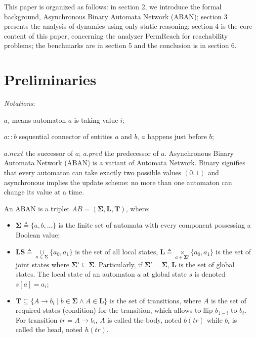 \documentclass[runningheads]{llncs}
\begin{document}
This paper is organized as follows: in section 2, we introduce the formal background, Asynchronous Binary Automata Network (ABAN); section 3 presents the analysis of dynamics using only static reasoning; 
section 4 is the core content of this paper, concerning the analyzer PermReach for reachability problems; 
the benchmarks are in section 5 and the conclusion is in section 6.
\section{Preliminaries}\label{sect:2}
\textit{Notations}:

$a_i$ means automaton $a$ is taking value $i$;

$a::b$ sequential connector of entities $a$ and $b$, $a$ happens just before $b$;

$a.next$ the successor of $a$; $a.pred$ the predecessor of $a$.
\bigbreak
Asynchronous Binary Automata Network (ABAN) is a variant of Automata Network.
Binary signifies that every automaton can take exactly two possible values $(0,1)$ and asynchronous implies the update scheme: no more than one automaton can change its value at a time. 

\begin{definition}[ABAN]
An ABAN is a triplet $AB = (\mathbf{\Sigma},\mathbf{L},\mathbf{T})$, where:
\begin{itemize}
\item $\mathbf{\Sigma}\triangleq\{a,b,\ldots\}$ is the finite set of automata with every component possessing a Boolean value;
\item %
$\mathbf{LS}\triangleq \underset{a\in \mathbf{\Sigma}}{\cup} \{a_0,a_1\}$ is the set of all local states, $\mathbf{L}\triangleq \underset{a\in \mathbf{\Sigma'}}{\times} \{a_0,a_1\}$ is the set of joint states where $\mathbf{\Sigma'}\subseteq\mathbf{\Sigma}$. Particularly, if $\mathbf{\Sigma'}=\mathbf{\Sigma}$, $\mathbf{L}$ is the set of global states. 
The local state of an automaton $a$ at global state $s$ is denoted $s[a]=a_i$;
\item $\mathbf{T}\subseteq \{A\to b_{i}\mid b\in \mathbf{\Sigma} \land A\in \mathbf{L}\}$ is the set of transitions, where $A$ is the set of required states (condition) for the transition, which allows to flip $b_{1-i}$ to $b_i$. 
For transition $tr=A\to b_{i}$, $A$ is called the body, noted $b(tr)$ while $b_i$ is called the head, noted $h(tr)$.
\end{itemize}
\end{definition}
\end{document}
